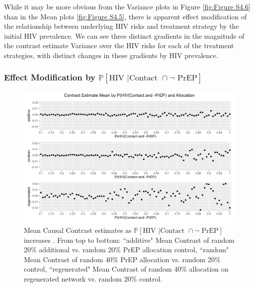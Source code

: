 \documentclass{article}
\theoremstyle{definition}
\begin{document}
While it may be more obvious from the Variance plots in Figure \ref{fig:Figure S4.6} than in the Mean plots \ref{fig:Figure S4.5}, there is apparent effect modification of the relationship between underlying HIV risks and treatment strategy by the initial HIV prevalence. We can see three distinct gradients in the magnitude of the contrast estimate Variance over the HIV risks for each of the treatment strategies, with distinct changes in these gradients by HIV prevalence. 
\subsubsection{Effect Modification by \texorpdfstring{$\mathbb{P}[\text{HIV } | \text {Contact } \cap \neg \text{ PrEP}]$}{ℙ[HIV | ¬PrEP]}}
\begin{figure}[H]
    \centering
    \includegraphics[width=\linewidth]{Figures/p1 Mean plots.png}
    \caption{Mean Causal Contrast estimates as $\mathbb{P}\left[\text{HIV } \vert \text {Contact } \cap \neg \text{ PrEP}\right]$ increases . From top to bottom: ``additive" Mean Contrast of random 20\% additional vs. random 20\% PrEP allocation control, ``random" Mean Contrast of random 40\% PrEP allocation vs. random 20\% control, ``regenerated" Mean Contrast of random 40\% allocation on regenerated network vs. random 20\% control.}
    \label{fig:Figure S4.7}
\end{figure}
\end{document}
